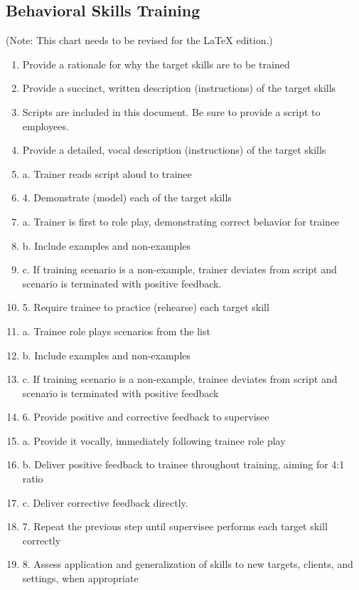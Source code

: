 \subsection{Behavioral Skills Training} 
(Note: This chart needs to be revised for the LaTeX edition.)
\begin{enumerate}
\item Provide a rationale for why the target skills are to be trained
\item Provide a succinct, written description (instructions) of the target skills 
\item Scripts are included in this document. Be sure to provide a script to employees.
\item Provide a detailed, vocal description (instructions) of the target skills
\item        a. Trainer reads script aloud to trainee
\item    4. Demonstrate (model) each of the target skills 
\item    a. Trainer is first to role play, demonstrating correct behavior for trainee
\item        b. Include examples and non-examples 
\item        c. If training scenario is a non-example, trainer deviates from script and scenario is terminated with positive feedback.
\item    5. Require trainee to practice (rehearse) each target skill
\item        a.  Trainee role plays scenarios from the list
\item        b. Include examples and non-examples 
\item        c. If training scenario is a non-example, trainee deviates from script and scenario is terminated with positive feedback
\item    6. Provide positive and corrective feedback to supervisee
\item        a. Provide it vocally, immediately following trainee role play
\item        b. Deliver positive feedback to trainee throughout training, aiming for 4:1 ratio
\item        c. Deliver corrective feedback directly.  
\item    7. Repeat the previous step until supervisee performs each target skill correctly 
\item    8. Assess application and generalization of skills to new targets, clients, and settings, when appropriate
\end{enumerate}

